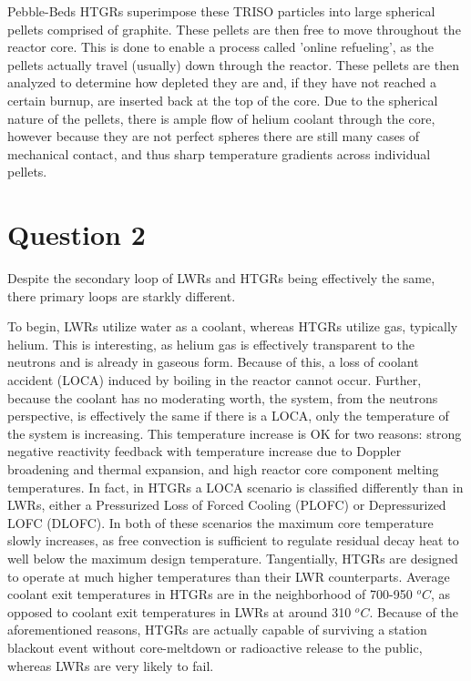 \documentclass{article}
\begin{document}
Pebble-Beds HTGRs superimpose these TRISO particles into large spherical pellets comprised of graphite. These pellets are then free to move throughout the reactor core. This is done to enable a process called 'online refueling', as the pellets actually travel (usually) down through the reactor. These pellets are then analyzed to determine how depleted they are and, if they have not reached a certain burnup, are inserted back at the top of the core. Due to the spherical nature of the pellets, there is ample flow of helium coolant through the core, however because they are not perfect spheres there are still many cases of mechanical contact, and thus sharp temperature gradients across individual pellets. 

\newpage
\section*{Question 2}

Despite the secondary loop of LWRs and HTGRs being effectively the same, there primary loops are starkly different. 

To begin, LWRs utilize water as a coolant, whereas HTGRs utilize gas, typically helium. This is interesting, as helium gas is effectively transparent to the neutrons and is already in gaseous form. Because of this, a loss of coolant accident (LOCA) induced by boiling in the reactor cannot occur. Further, because the coolant has no moderating worth, the system, from the neutrons perspective, is effectively the same if there is a LOCA, only the temperature of the system is increasing. This temperature increase is OK for two reasons: strong negative reactivity feedback with temperature increase due to Doppler broadening and thermal expansion, and high reactor core component melting temperatures. In fact, in HTGRs a LOCA scenario is classified differently than in LWRs, either a Pressurized Loss of Forced Cooling (PLOFC) or Depressurized LOFC (DLOFC). In both of these scenarios the maximum core temperature slowly increases, as free convection is sufficient to regulate residual decay heat to well below the maximum design temperature. Tangentially, HTGRs are designed to operate at much higher temperatures than their LWR counterparts. Average coolant exit temperatures in HTGRs are in the neighborhood of 700-950 $^oC$, as opposed to coolant exit temperatures in LWRs at around 310 $^oC$. Because of the aforementioned reasons, HTGRs are actually capable of surviving a station blackout event without core-meltdown or radioactive release to the public, whereas LWRs are very likely to fail. 
\end{document}
